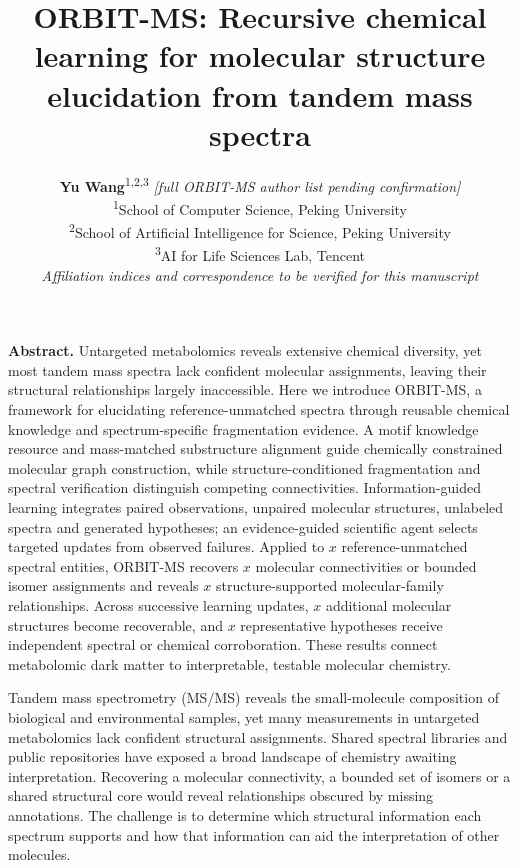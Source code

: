 \documentclass[11pt]{article}
\title{ORBIT-MS: Recursive chemical learning for molecular structure elucidation from tandem mass spectra}
\author{\textbf{Yu Wang}\textsuperscript{1,2,3} \quad \textit{[full ORBIT-MS author list pending confirmation]}\\[7pt]
\textsuperscript{1}School of Computer Science, Peking University\\
\textsuperscript{2}School of Artificial Intelligence for Science, Peking University\\
\textsuperscript{3}AI for Life Sciences Lab, Tencent\\[4pt]
\textit{Affiliation indices and correspondence to be verified for this manuscript}}
\date{}
\newcommand{\pending}[1]{\ensuremath{x}}
\begin{document}
\maketitle

\begin{orbitabstract}
\noindent\textbf{Abstract.}
Untargeted metabolomics reveals extensive chemical diversity, yet most tandem mass spectra lack confident molecular assignments, leaving their structural relationships largely inaccessible. Here we introduce ORBIT-MS, a framework for elucidating reference-unmatched spectra through reusable chemical knowledge and spectrum-specific fragmentation evidence. A motif knowledge resource and mass-matched substructure alignment guide chemically constrained molecular graph construction, while structure-conditioned fragmentation and spectral verification distinguish competing connectivities. Information-guided learning integrates paired observations, unpaired molecular structures, unlabeled spectra and generated hypotheses; an evidence-guided scientific agent selects targeted updates from observed failures. Applied to \pending{r1-01} reference-unmatched spectral entities, ORBIT-MS recovers \pending{abstract-structural-assignments} molecular connectivities or bounded isomer assignments and reveals \pending{family-relationship-count} structure-supported molecular-family relationships. Across successive learning updates, \pending{r3-12} additional molecular structures become recoverable, and \pending{independent-corroborated-anchors} representative hypotheses receive independent spectral or chemical corroboration. These results connect metabolomic dark matter to interpretable, testable molecular chemistry.
\end{orbitabstract}

\par

Tandem mass spectrometry (MS/MS) reveals the small-molecule composition of biological and environmental samples, yet many measurements in untargeted metabolomics lack confident structural assignments.\cite{daSilva2015,Alseekh2021} Shared spectral libraries and public repositories have exposed a broad landscape of chemistry awaiting interpretation.\cite{Wang2016GNPS} Recovering a molecular connectivity, a bounded set of isomers or a shared structural core would reveal relationships obscured by missing annotations. The challenge is to determine which structural information each spectrum supports and how that information can aid the interpretation of other molecules.
\end{document}
